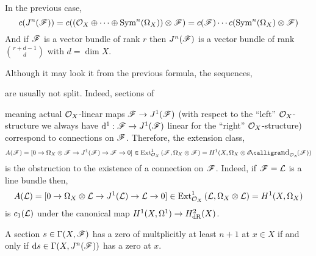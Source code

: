 \documentclass[12pt]{article}
\begin{document}
\begin{cor}
In the previous case,
\[ c(J^n(\mathscr{F})) = c((\mathcal{O}_{X} \oplus \cdots \oplus \mathrm{Sym}^{n}\! \left( \Omega_X \right)) \otimes \mathscr{F}) = c(\mathscr{F}) \cdots c(\mathrm{Sym}^{n}\! \left( \Omega_X \right) \otimes \mathscr{F}) \]
And if $\mathscr{F}$ is a vector bundle of rank $r$ then $J^n(\mathscr{F})$ is a vector bundle of rank ${ r + d - 1 \choose d }$ with $d = \dim{X}$.
\end{cor}

\begin{rmk}
Although it may look it from the previous formula, the sequences,
\begin{center}
\end{center}
are usually not split. Indeed, sections of
\begin{center}
\end{center}
meaning actual $\mathcal{O}_{X}$-linear maps $\mathscr{F} \to J^1(\mathscr{F})$ (with respect to the ``left'' $\mathcal{O}_{X}$-structure we always have $\mathrm{d}^1  :\mathscr{F} \to J^1(\mathscr{F})$ linear for the ``right'' $\mathcal{O}_{X}$-structure) correspond to connections on $\mathscr{F}$. Therefore, the extension class,
\[ A(\F) = [0 \to \Omega_X \ot \F \to J^1(\F) \to \F \to 0] \in \Ext{1}{\struct{X}}{\F}{\Omega_X \otimes \F} = H^1(X, \Omega_X \otimes \shEnd{\struct{X}}{\F}) \]
is the obstruction to the existence of a connection on $\mathscr{F}$. Indeed, if $\mathscr{F} = \mathcal{L}$ is a line bundle then,
\[ A(\mathcal{L}) = [0 \to \Omega_X \otimes \mathcal{L} \to J^1(\mathcal{L}) \to \mathcal{L} \to 0] \in \mathrm{Ext}^{1}_{\mathcal{O}_{X}} \left( \mathcal{L}, \Omega_X \otimes \mathcal{L} \right) = H^1(X, \Omega_X) \]
is $c_1(\mathcal{L})$ under the canonical map $H^1(X, \Omega^1) \to H^2_{\mathrm{dR}}(X)$.
\end{rmk}

\begin{prop}
A section $s \in \Gamma(X, \mathscr{F})$ has a zero of multplicitly at least $n+1$ at $x \in X$ if and only if $\mathrm{d}{s} \in \Gamma(X, J^n(\mathscr{F}))$ has a zero at $x$.
\end{prop}
\end{document}
